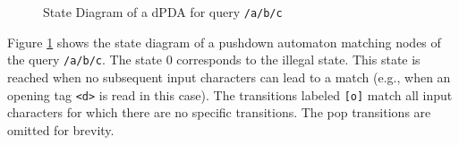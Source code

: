 \begin{figure}
\centering
{}
\caption{State Diagram of a dPDA for query \texttt{/a/b/c}}
\label{fig:exampleFSA}
\end{figure}

Figure \ref{fig:exampleFSA} shows the state diagram of a pushdown automaton
matching nodes of the query \verb;/a/b/c;. The state $0$ corresponds
to the illegal state. This state is reached when no subsequent input characters
can lead to a match (e.g., when an opening tag \verb;<d>; is read in this
case). The transitions labeled \verb;[o]; match all input characters for which
there are no specific transitions. The pop transitions are omitted for brevity.





